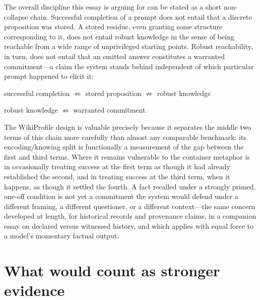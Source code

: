 \documentclass[11pt]{article}
\begin{document}
The overall discipline this essay is arguing for can be stated as a short non-collapse chain. Successful completion of a prompt does not entail that a discrete proposition was stored. A stored residue, even granting some structure corresponding to it, does not entail robust knowledge in the sense of being reachable from a wide range of unprivileged starting points. Robust reachability, in turn, does not entail that an emitted answer constitutes a warranted commitment---a claim the system stands behind independent of which particular prompt happened to elicit it:
\begin{center}
\small
successful completion \;$\not\Rightarrow$\; stored proposition \;$\not\Rightarrow$\; robust knowledge

\vspace{2pt}
robust knowledge \;$\not\Rightarrow$\; warranted commitment.
\end{center}
The WikiProfile design is valuable precisely because it separates the middle two terms of this chain more carefully than almost any comparable benchmark: its encoding/knowing split is functionally a measurement of the gap between the first and third terms. Where it remains vulnerable to the container metaphor is in occasionally treating success at the first term as though it had already established the second, and in treating success at the third term, when it happens, as though it settled the fourth. A fact recalled under a strongly primed, one-off condition is not yet a commitment the system would defend under a different framing, a different questioner, or a different context---the same concern developed at length, for historical records and provenance claims, in a companion essay on declared versus witnessed history, and which applies with equal force to a model's momentary factual output.

\section{What would count as stronger evidence}
\end{document}
